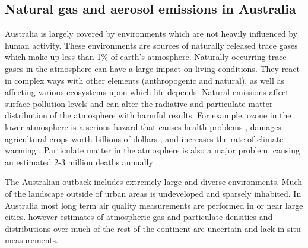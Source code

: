 \subsection{Natural gas and aerosol emissions in Australia}

Australia is largely covered by environments which are not heavily influenced by human activity.
These environments are sources of naturally released trace gases which make up less than 1\% of earth's atmosphere.
Naturally occurring trace gases in the atmosphere can have a large impact on living conditions.
They react in complex ways with other elements (anthropogenic and natural), as well as affecting various ecosystems upon which life depends.
Natural emissions affect surface pollution levels and can alter the radiative and particulate matter distribution of the atmosphere with harmful results.
For example, ozone in the lower atmosphere is a serious hazard that causes health problems \cite{Hsieh_2013}, damages agricultural crops worth billions of dollars \cite{Avnery_2011}, and increases the rate of climate warming \cite{IPCC_2013_chap8}.
Particulate matter in the atmosphere is also a major problem, causing an estimated 2-3 million deaths annually \cite{Hoek_2013, 19627030, Silva_2013, Lelieveld_2015}.

The Australian outback includes extremely large and diverse environments.
Much of the landscape outside of urban areas is undeveloped and sparsely inhabited.
In Australia most long term air quality measurements are performed in or near large cities.
however estimates of atmospheric gas and particulate densities and distributions over much of the rest of the continent are uncertain and lack in-situ measurements.
